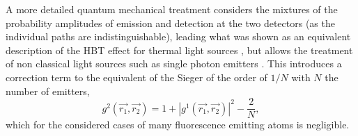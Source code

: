 A more detailed quantum mechanical treatment considers the mixtures of the probability amplitudes of emission and detection at the two detectors (as the individual paths are indistinguishable), leading what was shown as an equivalent description of the HBT effect for thermal light sources \cite{fano1961,sudarshan1963,glauber2006}, but allows the treatment of non classical light sources such as single photon emitters \cite{mandel1995,classen2017}. This introduces a correction term to the equivalent of the Sieger of the order of $1/N$ with $N$ the number of emitters,
\begin{equation}
	g^2(\vec{r_1},\vec{r_2}) = 1+ |g^1(\vec{r_1},\vec{r_2}) |^2 - \frac{2}{N} ,
\end{equation}
which for the considered cases of many fluorescence emitting atoms is negligible.


